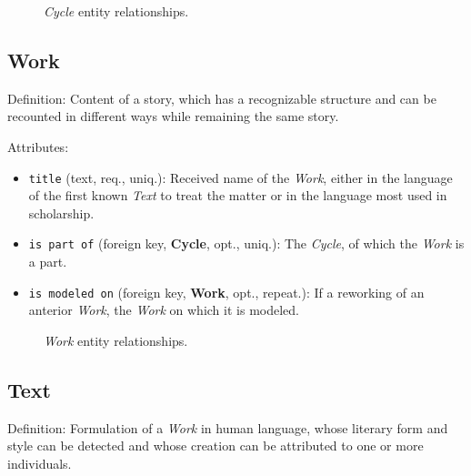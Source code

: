 \begin{figure}[ht]
    \begin{center}
        
    \end{center}
\label{fig:CycleER}
\caption{\textit{Cycle} entity relationships.}
\end{figure}


\subsection{Work}

Definition: Content of a story, which has a recognizable structure and can be recounted in different ways while remaining the same story.

\vspace{1em}
\noindent Attributes:
\begin{itemize}
    \item \texttt{title} (text, req., uniq.): Received name of the \textit{Work}, either in the language of the first known \textit{Text} to treat the matter or in the language most used in scholarship.
    \item \texttt{is part of} (foreign key, \textbf{Cycle}, opt., uniq.): The \textit{Cycle}, of which the \textit{Work} is a part.
    \item \texttt{is modeled on} (foreign key, \textbf{Work}, opt., repeat.): If a reworking of an anterior \textit{Work}, the \textit{Work} on which it is modeled.
\end{itemize}


\begin{figure}[ht]
    \begin{center}
        
    \end{center}
\label{fig:WorkER}
\caption{\textit{Work} entity relationships.}
\end{figure}


\subsection{Text}

Definition: Formulation of a \textit{Work} in human language, whose literary form and style can be detected and whose creation can be attributed to one or more individuals.


